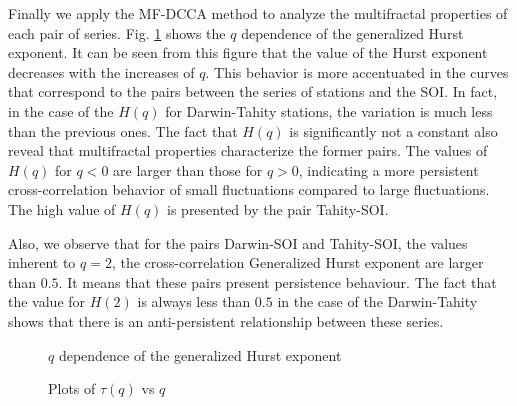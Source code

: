 \documentclass[onecolumn, preprint,aps,amsmath, amssymb, superscriptaddress]{revtex4}
\begin{document}
Finally we apply the MF-DCCA method to analyze the multifractal properties of each pair of series. Fig. \ref{fig:mfdcca_H} shows the $q$ dependence of the generalized Hurst exponent. It can be seen from this figure that the value of the Hurst exponent decreases with the increases of $q$. This behavior is more accentuated in the curves that correspond to the pairs between the series of stations and the SOI. In fact, in the case of the $H(q)$ for Darwin-Tahity stations, the variation is much less than the previous ones. The fact that $H
(q)$ is significantly not a constant also reveal that multifractal properties characterize the former pairs. The values of $H(q)$ for $q < 0$ are larger than those for $q > 0$, indicating a more persistent cross-correlation behavior of
small fluctuations compared to large fluctuations. The high value of $H(q)$ is presented by the pair Tahity-SOI.

Also, we observe that for the pairs Darwin-SOI and Tahity-SOI, the values inherent to $q = 2$, the cross-correlation Generalized Hurst exponent are larger than $0.5$. It means that these pairs present persistence behaviour. The fact that the value for $H(2 )$ is always less than $0.5$ in the case of the Darwin-Tahity shows that there is an anti-persistent relationship between these series.

 


\begin{figure}
\caption{$q$ dependence of the generalized Hurst exponent}
\label{fig:mfdcca_H}
\end{figure}

\begin{figure}
\caption{Plots of $\tau(q)$ vs $q$}
\label{fig:mfdcca_tau}
\end{figure}
\end{document}
